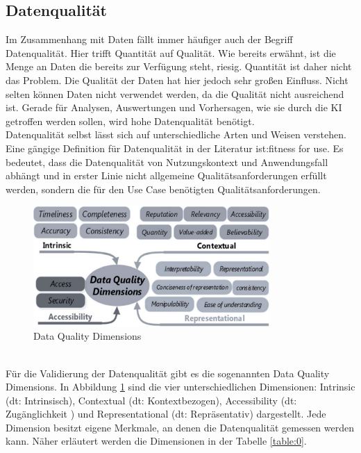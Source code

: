 \begin{onehalfspace}
    \subsection{Datenqualität}
    \label{subsubsec:datenqualität}
        Im Zusammenhang mit Daten fällt immer häufiger auch der Begriff Datenqualität. Hier trifft Quantität auf Qualität. Wie bereits erwähnt, ist die Menge an Daten die bereits zur Verfügung steht, riesig. Quantität ist daher nicht das Problem. Die Qualität der Daten hat hier jedoch sehr großen Einfluss. Nicht selten können Daten nicht verwendet werden, da die Qualität nicht ausreichend ist. Gerade für Analysen, Auswertungen und Vorhersagen, wie sie durch die \ac*{KI} getroffen werden sollen, wird hohe Datenqualität benötigt.\cite{Byabazaire2020}
        \\
        Datenqualität selbst lässt sich auf unterschiedliche Arten und Weisen verstehen.\cite{Yalaoui2021} Eine gängige Definition für Datenqualität in der Literatur ist:\glqq{}fitness for use\grqq{}.\cite{Faroukhi2020} Es bedeutet, dass die Datenqualität von Nutzungskontext und Anwendungsfall abhängt und in erster Linie nicht allgemeine Qualitätsanforderungen erfüllt werden, sondern die für den Use Case benötigten Qualitätsanforderungen.\cite{Faroukhi2020}\cite{Yalaoui2021}
        \begin{figure}[h]
            \centering
            \includegraphics[width = 9cm]{Bilder/Data_quality_dimensions.png}
            \caption{Data Quality Dimensions \cite{Taleb2018}}
            \label{fig:DataQualityDimensions}
        \end{figure}
        \\
        Für die Validierung der Datenqualität gibt es die sogenannten Data Quality Dimensions. In Abbildung \ref{fig:DataQualityDimensions} sind die vier unterschiedlichen Dimensionen: Intrinsic (\ac{dt}: Intrinsisch), Contextual (\ac{dt}: Kontextbezogen), Accessibility (\ac{dt}: Zugänglichkeit ) und Representational (\ac{dt}: Repräsentativ) dargestellt. Jede Dimension besitzt eigene Merkmale, an denen die Datenqualität gemessen werden kann. Näher erläutert werden die Dimensionen in der Tabelle \ref*{table:0}.

\end{onehalfspace}

